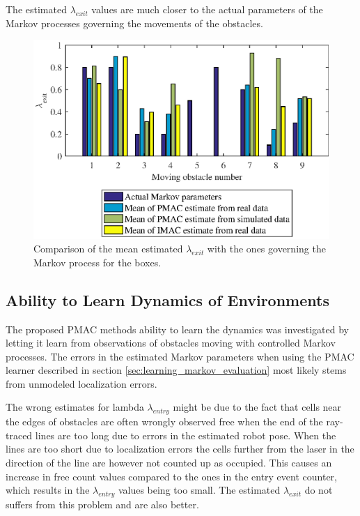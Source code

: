 The estimated $\lambda_{exit}$ values are much closer to the actual  parameters of the Markov processes governing the movements of the obstacles.

\begin{figure}
    \centering
    \includegraphics[scale=1]{chapters/evaluation/figures/compare_learned_markov_exit}
    \caption{Comparison of the mean estimated $\lambda_{exit}$ with the ones governing the Markov process for the boxes.}
    \label{fig:compare_learned_markov_exit}
\end{figure}



\subsection{Ability to Learn Dynamics of Environments}
The proposed PMAC methods ability to learn the dynamics was investigated by letting it learn from observations of obstacles moving with controlled Markov processes.
The errors in the estimated Markov parameters when using the PMAC learner described in section \ref{sec:learning_markov_evaluation} most likely stems from unmodeled localization errors. 

The wrong estimates for lambda $\lambda_{entry}$ might be due to the fact that cells near the edges of obstacles are often wrongly observed free when the end of the ray-traced lines are too long due to errors in the estimated robot pose.
When the lines are too short due to localization errors the cells further from the laser in the direction of the line are however not counted up as occupied.
This causes an increase in free count values compared to the ones in the entry event counter, which results in the $\lambda_{entry}$ values being too small.
The estimated $\lambda_{exit}$ do not suffers from this problem and are also better.